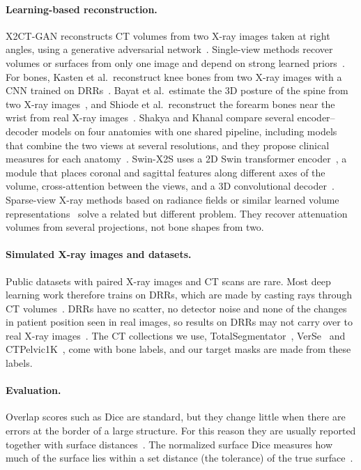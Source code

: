\documentclass[11pt]{article}
\begin{document}
\paragraph{Learning-based reconstruction.}
X2CT-GAN reconstructs CT volumes from two X-ray images taken at right angles, using a generative adversarial network~\cite{ying2019}. Single-view methods recover volumes or surfaces from only one image and depend on strong learned priors~\cite{henzler2018,shen2019,gu2024}. For bones, Kasten et al.\ reconstruct knee bones from two X-ray images with a CNN trained on DRRs~\cite{kasten2020}. Bayat et al.\ estimate the 3D posture of the spine from two X-ray images~\cite{bayat2020}, and Shiode et al.\ reconstruct the forearm bones near the wrist from real X-ray images~\cite{shiode2021}. Shakya and Khanal compare several encoder--decoder models on four anatomies with one shared pipeline, including models that combine the two views at several resolutions, and they propose clinical measures for each anatomy~\cite{shakya2023}. Swin-X2S uses a 2D Swin transformer encoder~\cite{swin2021}, a module that places coronal and sagittal features along different axes of the volume, cross-attention between the views, and a 3D convolutional decoder~\cite{liuk2025}. Sparse-view X-ray methods based on radiance fields or similar learned volume representations~\cite{cai2024,wang2025xfield} solve a related but different problem. They recover attenuation volumes from several projections, not bone shapes from two.

\paragraph{Simulated X-ray images and datasets.}
Public datasets with paired X-ray images and CT scans are rare. Most deep learning work therefore trains on DRRs, which are made by casting rays through CT volumes~\cite{siddon1985,ehlke2013}. DRRs have no scatter, no detector noise and none of the changes in patient position seen in real images, so results on DRRs may not carry over to real X-ray images~\cite{shakya2023}. The CT collections we use, TotalSegmentator~\cite{wasserthal2023}, VerSe~\cite{verse2021} and CTPelvic1K~\cite{pelvic2020}, come with bone labels, and our target masks are made from these labels.

\paragraph{Evaluation.}
Overlap scores such as Dice are standard, but they change little when there are errors at the border of a large structure. For this reason they are usually reported together with surface distances~\cite{taha2015,maierhein2024}. The normalized surface Dice measures how much of the surface lies within a set distance (the tolerance) of the true surface~\cite{nikolov2021}.
\end{document}
